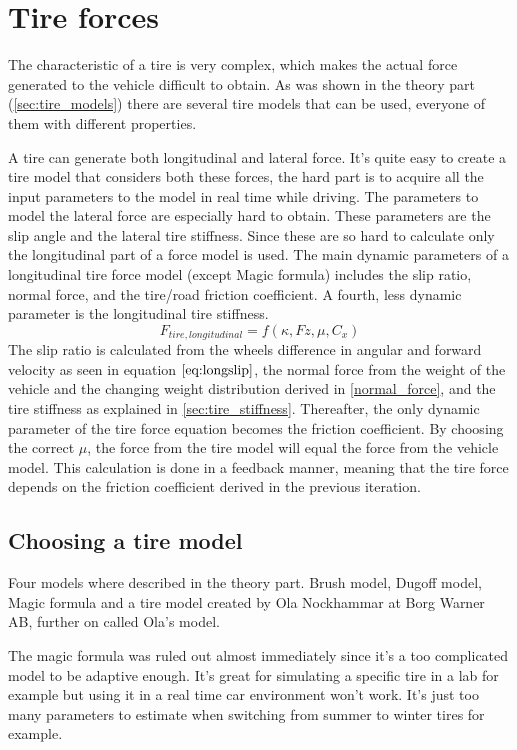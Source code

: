 \section{Tire forces}
The characteristic of a tire is very complex, which makes the actual force generated to the vehicle difficult to obtain. As was shown in the theory part (\ref{sec:tire_models}) there are several tire models that can be used, everyone of them with different properties.

A tire can generate both longitudinal and lateral force. It's quite easy to create a tire model that considers both these forces, the hard part is to acquire all the input parameters to the model in real time while driving. The parameters to model the lateral force are especially hard to obtain. These parameters are the slip angle and the lateral tire stiffness. Since these are so hard to calculate only the longitudinal part of a force model is used. The main dynamic parameters of a longitudinal tire force model (except Magic formula) includes the slip ratio, normal force, and the tire/road friction coefficient. A fourth, less dynamic parameter is the longitudinal tire stiffness. 
\begin{equation}
F_{tire, longitudinal} = f(\kappa, Fz, \mu, C_{x})
\end{equation}
The slip ratio is calculated from the wheels difference in angular and forward velocity as seen in equation $ \ref{eq:longslip} $, the normal force from the weight of the vehicle and the changing weight distribution derived in \ref{normal_force}, and the tire stiffness as explained in \ref{sec:tire_stiffness}. Thereafter, the only dynamic parameter of the tire force equation becomes the friction coefficient. By choosing the correct $ \mu $, the force from the tire model will equal the force from the vehicle model. This calculation is done in a feedback manner, meaning that the tire force depends on the friction coefficient derived in the previous iteration.

\subsection{Choosing a tire model}
Four models where described in the theory part. Brush model, Dugoff model, Magic formula and a tire model created by Ola Nockhammar at Borg Warner AB, further on called Ola's model.

The magic formula was ruled out almost immediately since it's a too complicated model to be adaptive enough. It's great for simulating a specific tire in a lab for example but using it in a real time car environment won't work. It's just too many parameters to estimate when switching from summer to winter tires for example. 

